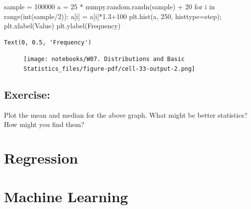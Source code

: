 \documentclass[
  letterpaper,
  DIV=11,
  numbers=noendperiod]{scrreprt}
\newenvironment{Shaded}{\begin{snugshade}}{\end{snugshade}}
\newcommand{\BuiltInTok}[1]{\textcolor[rgb]{0.00,0.23,0.31}{#1}}
\newcommand{\ControlFlowTok}[1]{\textcolor[rgb]{0.00,0.23,0.31}{#1}}
\newcommand{\DecValTok}[1]{\textcolor[rgb]{0.68,0.00,0.00}{#1}}
\newcommand{\FloatTok}[1]{\textcolor[rgb]{0.68,0.00,0.00}{#1}}
\newcommand{\KeywordTok}[1]{\textcolor[rgb]{0.00,0.23,0.31}{#1}}
\newcommand{\NormalTok}[1]{\textcolor[rgb]{0.00,0.23,0.31}{#1}}
\newcommand{\OperatorTok}[1]{\textcolor[rgb]{0.37,0.37,0.37}{#1}}
\newcommand{\StringTok}[1]{\textcolor[rgb]{0.13,0.47,0.30}{#1}}
\begin{document}
\begin{Shaded}
\begin{Highlighting}[]
\NormalTok{sample }\OperatorTok{=} \DecValTok{100000}
\NormalTok{a }\OperatorTok{=} \DecValTok{25} \OperatorTok{*}\NormalTok{ numpy.random.randn(sample) }\OperatorTok{+} \DecValTok{20}
\ControlFlowTok{for}\NormalTok{ i }\KeywordTok{in} \BuiltInTok{range}\NormalTok{(}\BuiltInTok{int}\NormalTok{(sample}\OperatorTok{/}\DecValTok{2}\NormalTok{)):}
\NormalTok{    a[i] }\OperatorTok{=}\NormalTok{ a[i]}\OperatorTok{*}\FloatTok{1.3}\OperatorTok{+}\DecValTok{100}
\NormalTok{plt.hist(a, }\DecValTok{250}\NormalTok{, histtype}\OperatorTok{=}\StringTok{\textquotesingle{}step\textquotesingle{}}\NormalTok{)}\OperatorTok{;}
\NormalTok{plt.xlabel(}\StringTok{\textquotesingle{}Value\textquotesingle{}}\NormalTok{)}
\NormalTok{plt.ylabel(}\StringTok{\textquotesingle{}Frequency\textquotesingle{}}\NormalTok{)}
\end{Highlighting}
\end{Shaded}

\begin{verbatim}
Text(0, 0.5, 'Frequency')
\end{verbatim}

\begin{figure}[H]

{\centering \texttt{[image: notebooks/W07. Distributions and Basic Statistics\_files/figure-pdf/cell-33-output-2.png]}

}

\end{figure}

\hypertarget{exercise-21}{%
\section{Exercise:}\label{exercise-21}}

Plot the mean and median for the above graph. What might be better
statistics? How might you find them?


\hypertarget{regression}{%
\chapter{Regression}\label{regression}}


\hypertarget{machine-learning}{%
\chapter{Machine Learning}\label{machine-learning}}
\end{document}
